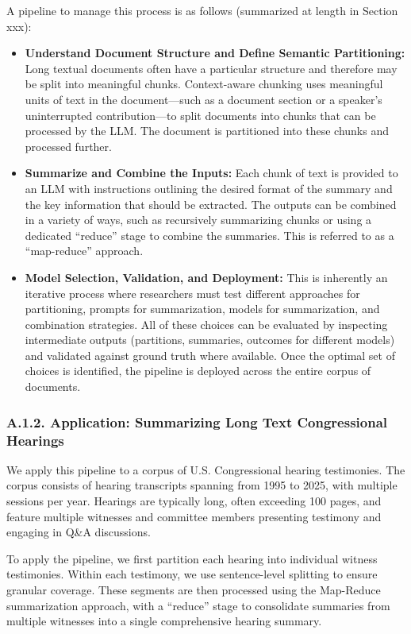 \documentclass[11pt]{article}
\begin{document}
A pipeline to manage this process is as follows (summarized at length in Section xxx):

\begin{itemize}
    \item \textbf{Understand Document Structure and Define Semantic Partitioning:} Long textual documents often have a particular structure and therefore may be split into meaningful chunks. Context-aware chunking uses meaningful units of text in the document---such as a document section or a speaker's uninterrupted contribution---to split documents into chunks that can be processed by the LLM. The document is partitioned into these chunks and processed further.
    \item \textbf{Summarize and Combine the Inputs:} Each chunk of text is provided to an LLM with instructions outlining the desired format of the summary and the key information that should be extracted. The outputs can be combined in a variety of ways, such as recursively summarizing chunks or using a dedicated ``reduce'' stage to combine the summaries. This is referred to as a ``map-reduce'' approach.
    \item \textbf{Model Selection, Validation, and Deployment:} This is inherently an iterative process where researchers must test different approaches for partitioning, prompts for summarization, models for summarization, and combination strategies. All of these choices can be evaluated by inspecting intermediate outputs (partitions, summaries, outcomes for different models) and validated against ground truth where available. Once the optimal set of choices is identified, the pipeline is deployed across the entire corpus of documents.
\end{itemize}

\subsubsection*{A.1.2. Application: Summarizing Long Text Congressional Hearings}

We apply this pipeline to a corpus of U.S. Congressional hearing testimonies. The corpus consists of hearing transcripts spanning from 1995 to 2025, with multiple sessions per year. Hearings are typically long, often exceeding 100 pages, and feature multiple witnesses and committee members presenting testimony and engaging in Q\&A discussions.

To apply the pipeline, we first partition each hearing into individual witness testimonies. Within each testimony, we use sentence-level splitting to ensure granular coverage. These segments are then processed using the Map-Reduce summarization approach, with a ``reduce'' stage to consolidate summaries from multiple witnesses into a single comprehensive hearing summary.
\end{document}
